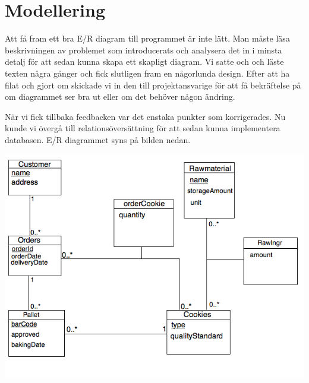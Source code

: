 \section{Modellering}

Att få fram ett bra E/R diagram till programmet är inte lätt. Man måste läsa beskrivningen av problemet som introducerats och analysera det in i minsta detalj för att sedan kunna skapa ett skapligt diagram. Vi satte och och läste texten några gånger och fick slutligen fram en någorlunda design. Efter att ha filat och gjort om skickade vi in den till projektansvarige för att få bekräftelse på om diagrammet ser bra ut eller om det behöver någon ändring. 

När vi fick tillbaka feedbacken var det enstaka punkter som korrigerades. Nu kunde vi övergå till relationsöversättning för att sedan kunna implementera databasen. E/R diagrammet syns på bilden nedan. 


\centerline{\includegraphics[scale = 0.6]{er.jpg}}